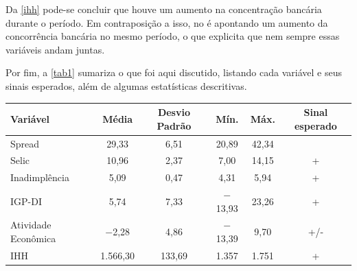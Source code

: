 \documentclass[a4paper,
               article,
               12pt,
               openany,
               oneside,
               english,
               brazil]{abntex2}
\numberwithin{equation}{section}
\begin{document}
    Da \autoref{ihh} pode-se concluir que houve um aumento na concentração bancária durante o período. Em contraposição a isso, no \textcite[11]{reb2017} é apontando um aumento da concorrência bancária no mesmo período, o que explicita que nem sempre essas variáveis andam juntas.

    Por fim, a \autoref{tab1} sumariza o que foi aqui discutido, listando cada variável e seus sinais esperados, além de algumas estatísticas descritivas.

    \begin{table}[h]
        {%
            \begin{tabular}
                {@{\extracolsep{5pt}}lccccc}
                \midrule
                Variável              & \multicolumn{1}{c}{Média} & \multicolumn{1}{c}{Desvio Padrão} & \multicolumn{1}{c}{Mín.} & \multicolumn{1}{c}{Máx.} & \multicolumn{1}{c}{Sinal esperado} \\
                \midrule
                Spread                & 29,33                     & 6,51                              & 20,89                    & 42,34                    &  \\
                Selic                 & 10,96                     & 2,37                              & 7,00                     & 14,15                    & + \\
                Inadimplência         & 5,09                      & 0,47                              & 4,31                     & 5,94                     & + \\
                IGP-DI                & 5,74                      & 7,33                              & $-$13,93                 & 23,26                    & + \\
                Atividade Econômica   & $-$2,28                   & 4,86                              & $-$13,39                 & 9,70                     & +/- \\
                IHH                   & 1.566,30                  & 133,69                            & 1.357                    & 1.751                    & + \\
                \midrule
            \end{tabular}
        }
        {}
    \end{table}
\end{document}

